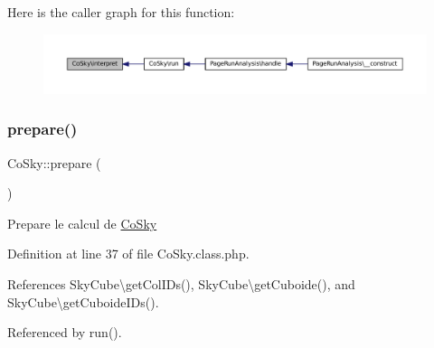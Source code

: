 Here is the caller graph for this function\+:\nopagebreak
\begin{figure}[H]
\begin{center}
\leavevmode
\includegraphics[width=350pt]{class_co_sky_a21516052fcf7945de5775fda402af8e3_icgraph}
\end{center}
\end{figure}
\mbox{\label{class_co_sky_a66c49b4768ec95a9d5b34e3de4a96811}} 
\subsubsection{\texorpdfstring{prepare()}{prepare()}}
{\footnotesize\ttfamily Co\+Sky\+::prepare (\begin{DoxyParamCaption}{ }\end{DoxyParamCaption})\hspace{0.3cm}{\ttfamily [protected]}}

Prepare le calcul de \hyperlink{class_co_sky}{Co\+Sky} 

Definition at line 37 of file Co\+Sky.\+class.\+php.



References Sky\+Cube\textbackslash{}get\+Col\+I\+Ds(), Sky\+Cube\textbackslash{}get\+Cuboide(), and Sky\+Cube\textbackslash{}get\+Cuboide\+I\+Ds().



Referenced by run().

